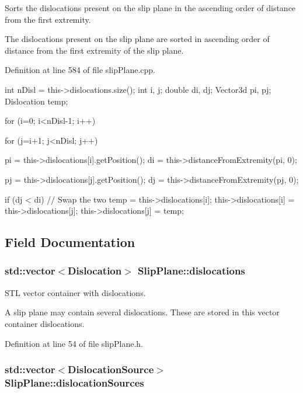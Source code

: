 \-Sorts the dislocations present on the slip plane in the ascending order of distance from the first extremity. 

\-The dislocations present on the slip plane are sorted in ascending order of distance from the first extremity of the slip plane. 

\-Definition at line 584 of file slip\-Plane.\-cpp.


\begin{DoxyCode}
{
  int nDisl = this->dislocations.size();
  int i, j;
  double di, dj;
  Vector3d pi, pj;
  Dislocation temp;

  for (i=0; i<nDisl-1; i++)
    {
      for (j=i+1; j<nDisl; j++)
        {
          pi = this->dislocations[i].getPosition();
          di = this->distanceFromExtremity(pi, 0);

          pj = this->dislocations[j].getPosition();
          dj = this->distanceFromExtremity(pj, 0);

          if (dj < di)
            {
              // Swap the two
              temp = this->dislocations[i];
              this->dislocations[i] = this->dislocations[j];
              this->dislocations[j] = temp;
            }
        }
    }
}
\end{DoxyCode}


\subsection{\-Field \-Documentation}
\hypertarget{classSlipPlane_ad92c7c409f7e161db449528389180910}{
\subsubsection[{dislocations}]{\setlength{\rightskip}{0pt plus 5cm}std\-::vector$<${\bf \-Dislocation}$>$ {\bf \-Slip\-Plane\-::dislocations}}}\label{db/d25/classSlipPlane_ad92c7c409f7e161db449528389180910}


\-S\-T\-L vector container with dislocations. 

\-A slip plane may contain several dislocations. \-These are stored in this vector container dislocations. 

\-Definition at line 54 of file slip\-Plane.\-h.

\hypertarget{classSlipPlane_a8e31e904fc6e68cc7ba70b0b57a278cc}{
\subsubsection[{dislocation\-Sources}]{\setlength{\rightskip}{0pt plus 5cm}std\-::vector$<${\bf \-Dislocation\-Source}$>$ {\bf \-Slip\-Plane\-::dislocation\-Sources}}}\label{db/d25/classSlipPlane_a8e31e904fc6e68cc7ba70b0b57a278cc}



